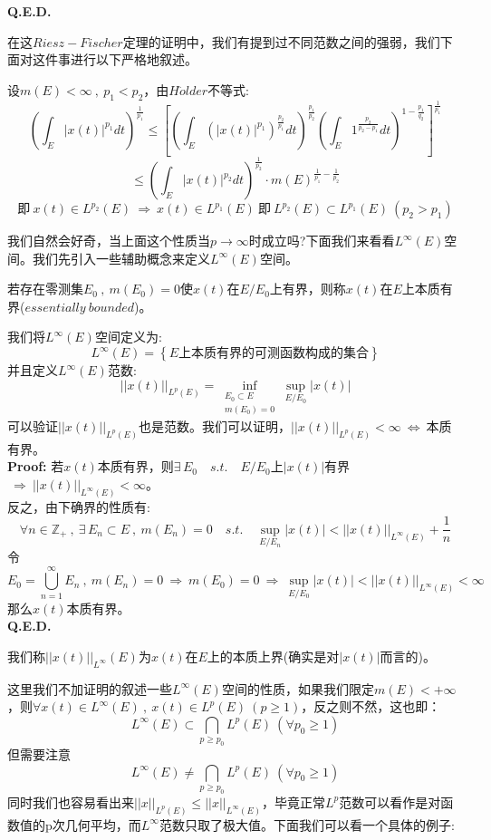 \textbf{Q.E.D.}

在这$Riesz-Fischer$定理的证明中，我们有提到过不同范数之间的强弱，我们下面对这件事进行以下严格地叙述。

设$m(E)<\infty \ , \ p_1<p_2$，由$H\ddot{o}lder$不等式:
\[\left(\int_E|x(t)|^{p_1}dt\right)^{\frac{1}{p_1}} \leq \left[\left(\int_E\left(|x(t)|^{p_1}\right)^{\frac{p_2}{p_1}}dt\right)^{\frac{p_1}{p_2}}\left(\int_E1^{\frac{p_2}{p_2-p_1}}dt\right)^{1-\frac{p_1}{q_2}}\right]^{\frac{1}{p_1}}\]
\[\leq \left(\int_E|x(t)|^{p_2}dt\right)^{\frac{1}{p_2}} \cdot m(E)^{\frac{1}{p_1}-\frac{1}{p_2}}\]
\[\text{即} \ x(t) \in L^{p_2}(E) \ \Rightarrow \ x(t) \in L^{p_1}(E) \ \text{即} \ L^{p_2}(E) \subset L^{p_1}(E) \ (p_2>p_1)\]

我们自然会好奇，当上面这个性质当$p \to \infty$时成立吗?下面我们来看看$L^{\infty}(E)$空间。我们先引入一些辅助概念来定义$L^{\infty}(E)$空间。
\begin{definition}[本质有界]
    若存在零测集$E_0 \ , \ m(E_0)=0$使$x(t)$在$E/E_0$上有界，则称$x(t)$在$E$上本质有界($essentially \ bounded$)。
\end{definition}
我们将$L^{\infty}(E)$空间定义为:
\[L^{\infty}(E)=\left\{E\text{上本质有界的可测函数构成的集合}\right\}\]
并且定义$L^{\infty}(E)$范数:
\[||x(t)||_{L^p(E)}=\mathop \text{inf}\limits_{\substack{E_0 \subset E \\ m(E_0)=0}}\mathop \text{sup}\limits_{E/E_0}|x(t)|\]
可以验证$||x(t)||_{L^p(E)}$也是范数。我们可以证明，$||x(t)||_{L^p(E)}<\infty \ \Leftrightarrow \ $本质有界。\\
\textbf{Proof:} 若$x(t)$本质有界，则$\exists \, E_0 \quad s.t. \quad E/E_0$上$|x(t)|$有界$ \ \Rightarrow \ ||x(t)||_{L^{\infty}(E)}<\infty$。\\
反之，由下确界的性质有:
\[\forall n \in \mathbb{Z}_+ \ , \ \exists \,E_n \subset E \ , \ m(E_n)=0 \quad s.t. \quad \mathop \text{sup}\limits_{E/E_n}|x(t)|<||x(t)||_{L^{\infty}(E)}+\frac{1}{n}\]
令
\[E_0=\bigcup_{n=1}^{\infty}E_n \ , \ m(E_n)=0 \ \Rightarrow \ m(E_0)=0 \ \Rightarrow \ \mathop \text{sup}\limits_{E/E_0}|x(t)|<||x(t)||_{L^{\infty}(E)}<\infty\]
那么$x(t)$本质有界。\\
\textbf{Q.E.D.}
\begin{definition}[本质上界] \label{infty}
    我们称$||x(t)||_{L^{\infty}} (E)$为$x(t)$在$E$上的本质上界(确实是对$|x(t)|$而言的)。
\end{definition}
这里我们不加证明的叙述一些$L^{\infty}(E)$空间的性质，如果我们限定$m(E)<+\infty$，则$\forall x(t) \in L^{\infty}(E) \ , \ x(t) \in L^p(E) \ (p \geq 1)$，反之则不然，这也即：
\[L^{\infty}(E) \subset \bigcap_{p \geq p_0}L^{p}(E) \ (\forall p_0 \geq 1)\]
但需要注意
\[L^{\infty}(E) \neq \bigcap_{p \geq p_0}L^{p}(E) \ (\forall p_0 \geq 1)\]
同时我们也容易看出来$||x||_{L^p(E)} \leq ||x||_{L^{\infty}(E)}$，毕竟正常$L^p$范数可以看作是对函数值的p次几何平均，而$L^{\infty}$范数只取了极大值。下面我们可以看一个具体的例子:
